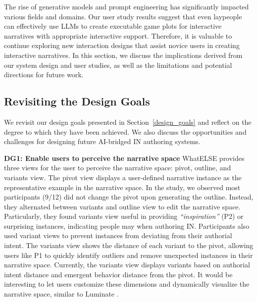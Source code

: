 The rise of generative models and prompt engineering has significantly impacted various fields and domains. Our user study results suggest that even laypeople can effectively use LLMs to create executable game plots for interactive narratives with appropriate interactive support. Therefore, it is valuable to continue exploring new interaction designs that assist novice users in creating interactive narratives. In this section, we discuss the implications derived from our system design and user studies, as well as the limitations and potential directions for future work.

\subsection{Revisiting the Design Goals}
We revisit our design goals presented in Section~\ref{design_goals} and reflect on the degree to which they have been achieved. We also discuss the opportunities and challenges for designing future AI-bridged IN authoring systems.

\textbf{DG1: Enable users to perceive the narrative space} {\sc WhatELSE} provides three views for the user to perceive the narrative space: pivot, outline, and variants view. The pivot view displays a user-defined narrative instance as the representative example in the narrative space. In the study, we observed most participants (9/12) did not change the pivot upon generating the outline. Instead, they alternated between variants and outline view to edit the narrative space. Particularly, they found variants view useful in providing {\it ``inspiration''} (P2) or surprising instances, indicating people may  when authoring IN. Participants also used variant views to prevent instances from deviating from their authorial intent. The variants view shows the distance of each variant to the pivot, allowing users like P1 to quickly identify outliers and remove unexpected instances in their narrative space. Currently, the variants view displays variants based on authorial intent distance and emergent behavior distance from the pivot. It would be interesting to let users customize these dimensions and dynamically visualize the narrative space, similar to Luminate \cite{suh2024luminate}.

